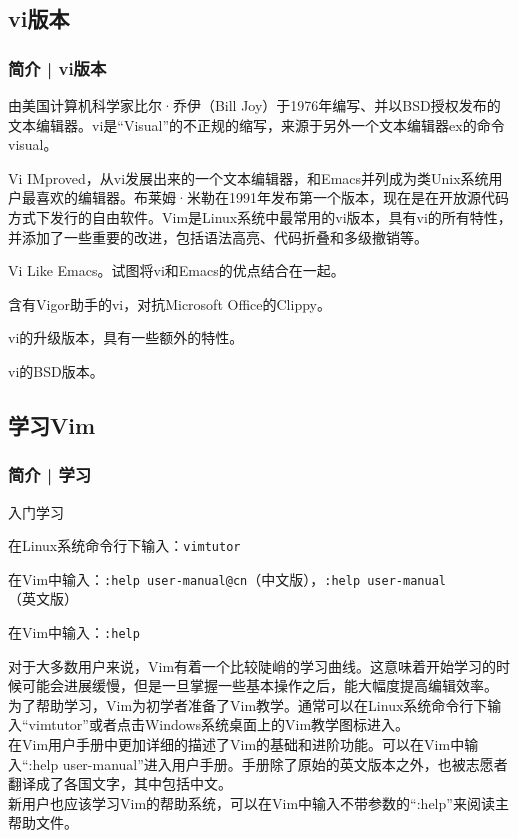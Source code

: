 \subsection{vi版本}
\begin{frame}
  \frametitle{简介 | vi版本}
  \begin{description}[<+->]
    \item[vi] 由美国计算机科学家比尔·乔伊（Bill Joy）于1976年编写、并以BSD授权发布的文本编辑器。vi是“Visual”的不正规的缩写，来源于另外一个文本编辑器ex的命令visual。
    \item[Vim] Vi IMproved，从vi发展出来的一个文本编辑器，和Emacs并列成为类Unix系统用户最喜欢的编辑器。布莱姆·米勒在1991年发布第一个版本，现在是在开放源代码方式下发行的自由软件。Vim是Linux系统中最常用的vi版本，具有vi的所有特性，并添加了一些重要的改进，包括语法高亮、代码折叠和多级撤销等。 
    \item[Vile] Vi Like Emacs。试图将vi和Emacs的优点结合在一起。 
    \item[Vigor] 含有Vigor助手的vi，对抗Microsoft Office的Clippy。
    \item[Elvis] vi的升级版本，具有一些额外的特性。 
    \item[Nvi] vi的BSD版本。 
  \end{description}
\end{frame}

\subsection{学习Vim}
\begin{frame}[fragile]
  \frametitle{简介 | 学习}
  \begin{block}{\alert{入门学习}}
    \begin{description}[<+->]
      \item[Vim初学者教学] 在Linux系统命令行下输入：\verb|vimtutor|
      \item[Vim用户手册] 在Vim中输入：\verb|:help user-manual@cn|（中文版），\verb|:help user-manual|（英文版）
      \item[Vim帮助系统] 在Vim中输入：\verb|:help|
    \end{description}
  \end{block}
  {\footnotesize
  对于大多数用户来说，Vim有着一个比较陡峭的学习曲线。这意味着开始学习的时候可能会进展缓慢，但是一旦掌握一些基本操作之后，能大幅度提高编辑效率。\\
  为了帮助学习，Vim为初学者准备了Vim教学。通常可以在Linux系统命令行下输入“vimtutor”或者点击Windows系统桌面上的Vim教学图标进入。\\
  在Vim用户手册中更加详细的描述了Vim的基础和进阶功能。可以在Vim中输入“:help user-manual”进入用户手册。手册除了原始的英文版本之外，也被志愿者翻译成了各国文字，其中包括中文。\\
  新用户也应该学习Vim的帮助系统，可以在Vim中输入不带参数的“:help”来阅读主帮助文件。}
\end{frame}

